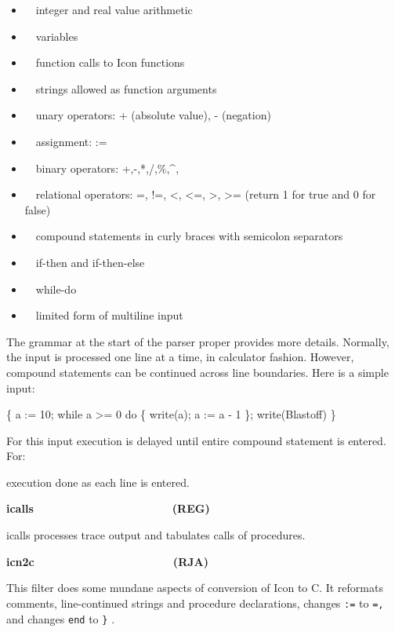 \begin{itemize}
\item \ \ integer and real value arithmetic
\item \ \ variables
\item \ \ function calls to Icon functions
\item \ \ strings allowed as function arguments
\item \ \ unary operators: + (absolute value), - (negation)
\item \ \ assignment: :=
\item \ \ binary operators: +,-,*,/,\%,\^{},
\item \ \ relational operators: =, !=, {\textless}, {\textless}=,
{\textgreater}, {\textgreater}= (return 1 for true and 0 for false)
\item \ \ compound statements in curly braces with semicolon separators
\item \ \ if-then and if-then-else
\item \ \ while-do
\item \ \ limited form of multiline input
\end{itemize}
The grammar at the start of the {\textquotedbl}parser{\textquotedbl}
proper provides more details. Normally, the input is processed one line
at a time, in calculator fashion. However, compound statements can be
continued across line boundaries. Here is a simple input:

{\sffamily
\{ a := 10; while a {\textgreater}= 0 do \{ write(a); a := a - 1 \};
write({\textquotedbl}Blastoff{\textquotedbl}) \}}

For this input execution is delayed until entire compound statement is
entered. For:



execution done as each line is entered. 

{\sffamily\bfseries
icalls\ \ \ \ \ \ \ \ \ \ \ \ \ \ \ \ \ \ \ \ \ \ (REG)}

\textsf{icalls} processes trace output and tabulates calls of
procedures.

{\sffamily\bfseries
icn2c\ \ \ \ \ \ \ \ \ \ \ \ \ \ \ \ \ \ \ \ \ \ (RJA)}

This filter does some mundane aspects of conversion of Icon to C. It
reformats comments, line-continued strings and procedure declarations,
changes \texttt{:=} to \texttt{=,} and changes \texttt{end} to
\texttt{{\textquotedbl}\}{\textquotedbl}} . 

